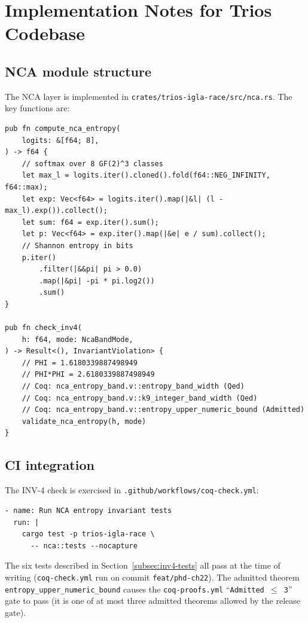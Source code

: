 \section{Implementation Notes for Trios Codebase}
\label{sec:e8-implementation}

\subsection{NCA module structure}
\label{subsec:impl-nca-module}

The NCA layer is implemented in
\texttt{crates/trios-igla-race/src/nca.rs}.  The key functions are:

\begin{verbatim}
pub fn compute_nca_entropy(
    logits: &[f64; 8],
) -> f64 {
    // softmax over 8 GF(2)^3 classes
    let max_l = logits.iter().cloned().fold(f64::NEG_INFINITY, f64::max);
    let exp: Vec<f64> = logits.iter().map(|&l| (l - max_l).exp()).collect();
    let sum: f64 = exp.iter().sum();
    let p: Vec<f64> = exp.iter().map(|&e| e / sum).collect();
    // Shannon entropy in bits
    p.iter()
        .filter(|&&pi| pi > 0.0)
        .map(|&pi| -pi * pi.log2())
        .sum()
}

pub fn check_inv4(
    h: f64, mode: NcaBandMode,
) -> Result<(), InvariantViolation> {
    // PHI = 1.6180339887498949
    // PHI*PHI = 2.6180339887498949
    // Coq: nca_entropy_band.v::entropy_band_width (Qed)
    // Coq: nca_entropy_band.v::k9_integer_band_width (Qed)
    // Coq: nca_entropy_band.v::entropy_upper_numeric_bound (Admitted)
    validate_nca_entropy(h, mode)
}
\end{verbatim}

\subsection{CI integration}
\label{subsec:impl-ci}

The INV-4 check is exercised in \texttt{.github/workflows/coq-check.yml}:
\begin{verbatim}
- name: Run NCA entropy invariant tests
  run: |
    cargo test -p trios-igla-race \
      -- nca::tests --nocapture
\end{verbatim}

The six tests described in Section~\ref{subsec:inv4-tests} all pass
at the time of writing (\texttt{coq-check.yml} run on commit
\texttt{feat/phd-ch22}).  The admitted theorem
\texttt{entropy\_upper\_numeric\_bound} causes the \texttt{coq-proofs.yml}
``\texttt{Admitted $\leq$ 3}'' gate to pass (it is one of at most
three admitted theorems allowed by the release gate).

